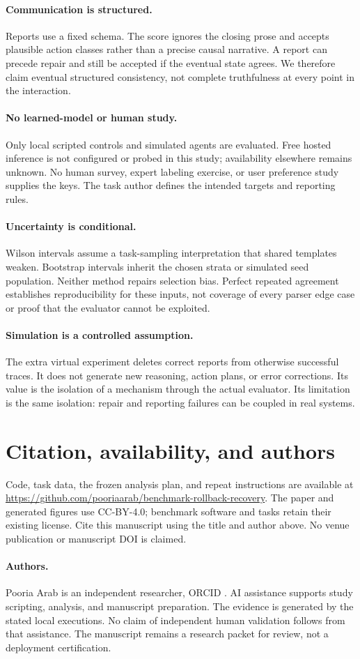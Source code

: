 \documentclass{article}
\begin{document}
\paragraph{Communication is structured.} Reports use a fixed schema. The score ignores the closing prose and accepts plausible action classes rather than a precise causal narrative. A report can precede repair and still be accepted if the eventual state agrees. We therefore claim eventual structured consistency, not complete truthfulness at every point in the interaction.
\paragraph{No learned-model or human study.} Only local scripted controls and simulated agents are evaluated. Free hosted inference is not configured or probed in this study; availability elsewhere remains unknown. No human survey, expert labeling exercise, or user preference study supplies the keys. The task author defines the intended targets and reporting rules.
\paragraph{Uncertainty is conditional.} Wilson intervals assume a task-sampling interpretation that shared templates weaken. Bootstrap intervals inherit the chosen strata or simulated seed population. Neither method repairs selection bias. Perfect repeated agreement establishes reproducibility for these inputs, not coverage of every parser edge case or proof that the evaluator cannot be exploited.
\paragraph{Simulation is a controlled assumption.} The extra virtual experiment deletes correct reports from otherwise successful traces. It does not generate new reasoning, action plans, or error corrections. Its value is the isolation of a mechanism through the actual evaluator. Its limitation is the same isolation: repair and reporting failures can be coupled in real systems.
\section{Citation, availability, and authors}
Code, task data, the frozen analysis plan, and repeat instructions are available at \url{https://github.com/pooriaarab/benchmark-rollback-recovery}. The paper and generated figures use CC-BY-4.0; benchmark software and tasks retain their existing license. Cite this manuscript using the title and author above. No venue publication or manuscript DOI is claimed.

\paragraph{Authors.} Pooria Arab is an independent researcher, ORCID \texttt{\AuthorOrcid}. AI assistance supports study scripting, analysis, and manuscript preparation. The evidence is generated by the stated local executions. No claim of independent human validation follows from that assistance. The manuscript remains a research packet for review, not a deployment certification.


\end{document}
